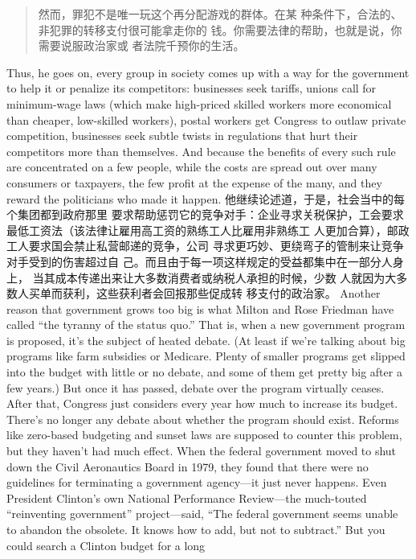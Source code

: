 \begin{paracol}{2}
\begin{quotation}
然而，罪犯不是唯一玩这个再分配游戏的群体。在某
种条件下，合法的、非犯罪的转移支付很可能拿走你的
钱。你需要法律的帮助，也就是说，你需要说服政治家或
者法院千预你的生活。
\end{quotation}
\switchcolumn*
Thus, he goes on, every group in society comes up with a way
for the government to help it or penalize its competitors: businesses seek tariffs, unions call for minimum-wage laws (which
make high-priced skilled workers more economical than
cheaper, low-skilled workers), postal workers get Congress to
outlaw private competition, businesses seek subtle twists in
regulations that hurt their competitors more than themselves.
And because the benefits of every such rule are concentrated on
a few people, while the costs are spread out over many consumers or taxpayers, the few profit at the expense of the many,
and they reward the politicians who made it happen.
\switchcolumn
他继续论述道，于是，社会当中的每个集团都到政府那里
要求帮助惩罚它的竞争对手：企业寻求关税保护，工会要求最低工资法（该法律让雇用高工资的熟练工人比雇用非熟练工
人更加合算），邮政工人要求国会禁止私营邮递的竞争，公司
寻求更巧妙、更绕弯子的管制来让竞争对手受到的伤害超过自
己。而且由于每一项这样规定的受益都集中在一部分人身上，
当其成本传递出来让大多数消费者或纳税人承担的时候，少数
人就因为大多数人买单而获利，这些获利者会回报那些促成转
移支付的政治家。
\switchcolumn*
Another reason that government grows too big is what Milton and Rose Friedman have called ``the tyranny of the status quo.'' That is, when a new government program is proposed,
it's the subject of heated debate. (At least if we're talking about
big programs like farm subsidies or Medicare. Plenty of smaller
programs get slipped into the budget with little or no debate,
and some of them get pretty big after a few years.) But once it
has passed, debate over the program virtually ceases. After that,
Congress just considers every year how much to increase its
budget. There's no longer any debate about whether the program should exist. Reforms like zero-based budgeting and sunset laws are supposed to counter this problem, but they haven't had much effect. When the federal government moved to shut
down the Civil Aeronautics Board in 1979, they found that
there were no guidelines for terminating a government
agency---it just never happens. Even President Clinton's own
National Performance Review---the much-touted ``reinventing
government'' project---said, ``The federal government seems
unable to abandon the obsolete. It knows how to add, but not
to subtract.'' But you could search a Clinton budget for a long

\end{paracol}
